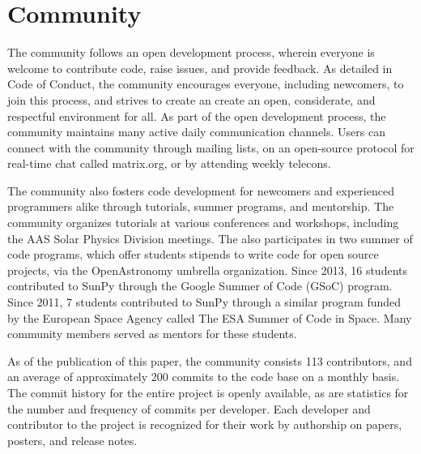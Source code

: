 \section{Community}
\label{sec:community}

The \sunpy community follows an open development process, wherein everyone is welcome to contribute code, raise issues, and provide feedback.
As detailed in \sunpy Code of Conduct, the community encourages everyone, including newcomers, to join this process, and strives to create an create an open, considerate, and respectful environment for all.
As part of the open development process, the \sunpy community maintains many active daily communication channels.
Users can connect with the community through mailing lists, on an open-source protocol for real-time chat called matrix.org, or by attending weekly telecons.

The \sunpy community also fosters code development for newcomers and experienced programmers alike through tutorials, summer programs, and mentorship.
The \sunpy community organizes tutorials at various conferences and workshops, including the AAS Solar Physics Division meetings.
The \sunpyproj also participates in two summer of code programs, which offer students stipends to write code for open source projects, via the OpenAstronomy umbrella organization.
Since 2013, 16 students contributed to SunPy through the Google Summer of Code (GSoC) program.
Since 2011, 7 students contributed to SunPy through a similar program funded by the European Space Agency called The ESA Summer of Code in Space.
Many \sunpy community members served as mentors for these students.

As of the publication of this paper, the \sunpy community consists 113 contributors, and an average of approximately 200 commits to the code base on a monthly basis.
The commit history for the entire project is openly available, as are statistics for the number and frequency of commits per developer.
Each developer and contributor to the \sunpy project is recognized for their work by authorship on papers, posters, and release notes.
